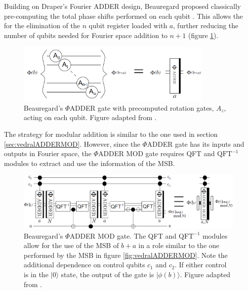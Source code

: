 \documentclass{article}
\begin{document}
Building on Draper's Fourier ADDER design, Beauregard proposed classically pre-computing the total phase shifts performed on each qubit \cite{Bea03}. This allows the for the elimination of the $n$ qubit register loaded with $a$, further reducing the number of qubits needed for Fourier space addition to $n+1$ (figure \ref{fig:phiADDERsmall}).
 \begin{figure}[!htbp]
\centering
\includegraphics[width=0.85\textwidth]
{PHIadder_small.png}
\captionsetup{format = hang}
\caption{Beauregard's $\Phi$ADDER gate with precomputed rotation gates, $A_z$, acting on each qubit. Figure adapted from \cite{Bea03}.}
\label{fig:phiADDERsmall}
\end{figure}

The strategy for modular addition is similar to the one used in section \ref{sec:vedralADDERMOD}. However, since the $\Phi$ADDER gate has its inputs and outputs in Fourier space, the $\Phi$ADDER MOD gate requires QFT and $\text{QFT}^{-1}$ modules to extract and use the information of the MSB.
\pagebreak
 \begin{figure}[!htbp]
\centering
\includegraphics[width=1\textwidth]
{PHIADDERMOD2.png}
\captionsetup{format = hang}
\caption{Beauregard's $\Phi$ADDER MOD gate. The QFT and $\text{QFT}^{-1}$ modules allow for the use of the MSB of $b+a$ in a  role similar to the one performed by the MSB in figure \ref{fig:vedralADDERMOD}. Note the additional dependence on control qubits $c_1$ and $c_2$. If either control is in the $|0\rangle$ state, the output of the gate is $|\phi(b)\rangle$. Figure adapted from \cite{Bea03}.}
\label{fig:PHIADDERMOD}
\end{figure}
\end{document}
